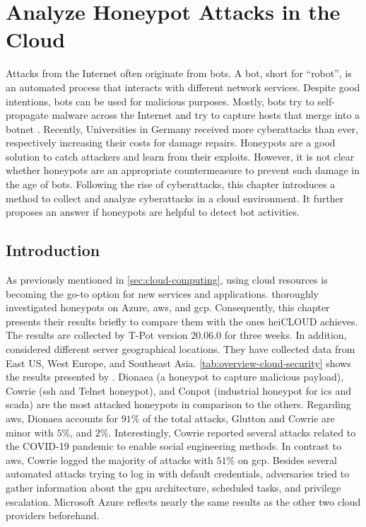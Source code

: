 \chapter{Analyze Honeypot Attacks in the Cloud}
\label{chap:cloud-security}

Attacks from the Internet often originate from bots.
A bot, short for \enquote{robot}, is an automated process that interacts with different network services.
Despite good intentions, bots can be used for malicious purposes.
Mostly, bots try to self-propagate malware across the Internet and try to capture hosts that merge into a botnet \cite{Feily2009}.
Recently, Universities in Germany received more cyberattacks than ever, respectively increasing their costs for damage repairs.
Honeypots are a good solution to catch attackers and learn from their exploits.
However, it is not clear whether honeypots are an appropriate countermeasure to prevent such damage in the age of bots.
Following the rise of cyberattacks, this chapter introduces a method to collect and analyze cyberattacks in a cloud environment.
It further proposes an answer if honeypots are helpful to detect bot activities.

\section{Introduction}

As previously mentioned in \autoref{sec:cloud-computing}, using cloud resources is becoming the go-to option for new services and applications.
\citet{Kelly2021} thoroughly investigated honeypots on Azure, \ac{aws}, and \ac{gcp}.
Consequently, this chapter presents their results briefly to compare them with the ones heiCLOUD achieves.
The results are collected by T-Pot version $20.06.0$ for three weeks.
In addition, \citet{Kelly2021} considered different server geographical locations.
They have collected data from East US, West Europe, and Southeast Asia.
\autoref{tab:overview-cloud-security} shows the results presented by \citet{Kelly2021}.
Dionaea (a honeypot to capture malicious payload), Cowrie (\ac{ssh} and Telnet honeypot), and Conpot (industrial honeypot for \acs{ics} and \acs{scada}) are the most attacked honeypots in comparison to the others.
Regarding \ac{aws}, Dionaea accounts for $91\%$ of the total attacks, Glutton and Cowrie are minor with $5\%$, and $2\%$.
Interestingly, Cowrie reported several attacks related to the COVID-19 pandemic to enable social engineering methods.
In contrast to \ac{aws}, Cowrie logged the majority of attacks with $51\%$ on \ac{gcp}.
Besides several automated attacks trying to log in with default credentials, adversaries tried to gather information about the \acs{gpu} architecture, scheduled tasks, and privilege escalation.
Microsoft Azure reflects nearly the same results as the other two cloud providers beforehand.

